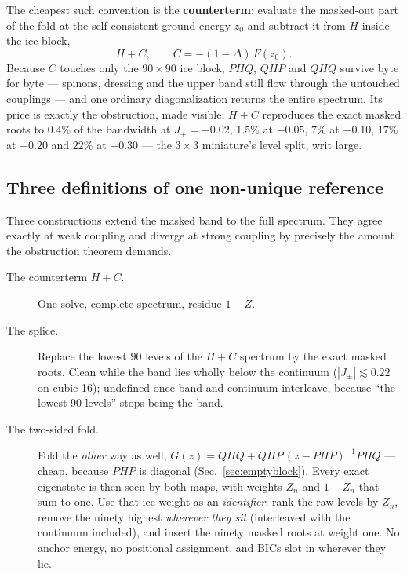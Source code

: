 \documentclass[11pt,a4paper]{article}
\newcommand{\Jpm}{J_{\pm}}
\begin{document}
The cheapest such convention is the \textbf{counterterm}: evaluate the
masked-out part of the fold at the self-consistent ground energy $z_0$ and
subtract it from $H$ inside the ice block,
\[
H+C, \qquad C=-(1-\Delta)\,F(z_0).
\]
Because $C$ touches only the $90\times90$ ice block, $PHQ$, $QHP$ and $QHQ$
survive byte for byte --- spinons, dressing and the upper band still flow
through the untouched couplings --- and one ordinary diagonalization returns
the entire spectrum.  Its price is exactly the obstruction, made visible:
$H+C$ reproduces the exact masked roots to $0.4\%$ of the bandwidth at
$\Jpm=-0.02$, $1.5\%$ at $-0.05$, $7\%$ at $-0.10$, $17\%$ at $-0.20$ and
$22\%$ at $-0.30$ --- the $3\times3$ miniature's level split, writ large.

\subsection{Three definitions of one non-unique reference}
\label{sec:twoside}

Three constructions extend the masked band to the full spectrum.  They agree
exactly at weak coupling and diverge at strong coupling by precisely the
amount the obstruction theorem demands.

\begin{description}
\item[The counterterm $H+C$.]  One solve, complete spectrum, residue $1-Z$.
\item[The splice.]  Replace the lowest $90$ levels of the $H+C$ spectrum by
the exact masked roots.  Clean while the band lies wholly below the
continuum ($|\Jpm|\lesssim0.22$ on cubic-16); undefined once band and
continuum interleave, because ``the lowest 90 levels'' stops being the band.
\item[The two-sided fold.]  Fold the \emph{other} way as well,
$G(z)=QHQ+QHP\,(z-PHP)^{-1}PHQ$ --- cheap, because $PHP$ is diagonal
(Sec.~\ref{sec:emptyblock}).  Every exact eigenstate is then seen by both
maps, with weights $Z_n$ and $1-Z_n$ that sum to one.  Use that ice weight
as an \emph{identifier}: rank the raw levels by $Z_n$, remove the ninety
highest \emph{wherever they sit} (interleaved with the continuum included),
and insert the ninety masked roots at weight one.  No anchor energy, no
positional assignment, and BICs slot in wherever they lie.
\end{description}
\end{document}
